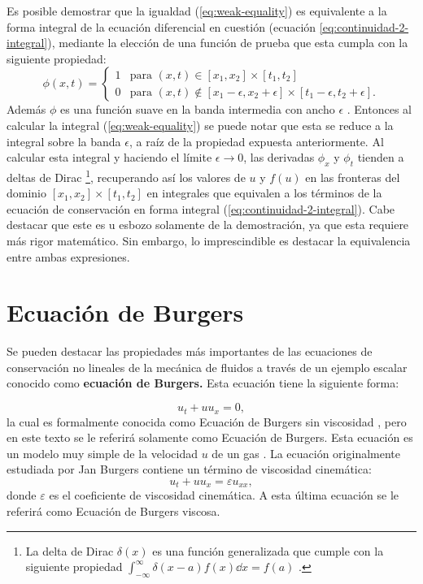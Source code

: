 Es posible demostrar que la igualdad (\ref{eq:weak-equality}) es equivalente a la forma integral de la ecuación diferencial en cuestión (ecuación \ref{eq:continuidad-2-integral}), mediante la elección de una función de prueba que esta cumpla con la siguiente propiedad:
\begin{equation}
	\phi(x,t) = 
	\begin{cases}
		1 & \text{para } (x,t) \in [x_1, x_2] \times [t_1, t_2]\\
		0 & \text{para } (x,t) \notin [x_1 - \epsilon, x_2 + \epsilon] \times [t_1 - \epsilon, t_2 + \epsilon].
 	\end{cases}
\end{equation}
Además $\phi$ es una función suave en la banda intermedia con ancho $\epsilon$ \cite{Leveque}. Entonces al calcular la integral (\ref{eq:weak-equality})  se puede notar que esta se reduce a la integral sobre la banda $\epsilon$, a raíz de la propiedad expuesta anteriormente. Al calcular esta integral y haciendo el límite $\epsilon \rightarrow 0$, las derivadas $\phi_x$ y $\phi_t$ tienden a deltas de Dirac \footnote{La delta de Dirac $\delta(x)$ es una función generalizada que cumple con la siguiente propiedad $\int_{-\infty}^{\infty} \delta(x-a) f(x)\dd{x} = f(a)$ \cite{methods}.}, recuperando así los valores de $u$ y $ f(u)$ en las fronteras del dominio $ [x_1, x_2] \times [t_1, t_2]$ en integrales que equivalen a los términos de la ecuación de conservación en forma integral (\ref{eq:continuidad-2-integral})\cite{Leveque}. Cabe destacar que este es u esbozo solamente de la demostración, ya que esta requiere más rigor matemático. Sin embargo, lo imprescindible es destacar la equivalencia entre ambas expresiones.

\section{Ecuación de Burgers}
Se pueden destacar las propiedades más importantes de las ecuaciones de conservación no lineales de la mecánica de fluidos a través de un ejemplo escalar conocido como \textbf{ecuación de Burgers.} Esta ecuación tiene la siguiente forma:

\begin{equation}
	u_t + u u_x = 0,
	\label{eq:burgers}
\end{equation}
la cual es formalmente conocida como Ecuación de Burgers sin viscosidad \cite{Leveque}, pero en este texto se le referirá solamente como Ecuación de Burgers. Esta ecuación es un modelo muy simple de la velocidad $u$ de un gas \cite{Cameron}. La ecuación originalmente estudiada por Jan Burgers \cite{Leveque} contiene un término de viscosidad cinemática:
\begin{equation}
	u_t + u u_x = \varepsilon u_{xx},
	\label{eq:burgers-vis}
\end{equation}
donde $\varepsilon$ es el coeficiente de viscosidad cinemática. A esta última ecuación se le referirá como Ecuación de Burgers viscosa.

